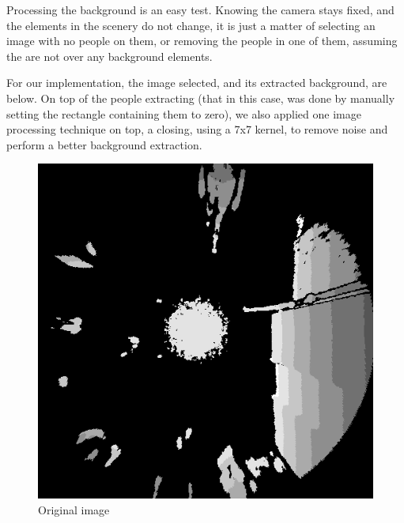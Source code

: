 \documentclass[conference]{IEEEtran}
\begin{document}
Processing the background is an easy test. Knowing the camera stays fixed, and the elements in the scenery do not change, it is just a matter of selecting an image with no people on them, or removing the people in one of them, assuming the are not over any background elements.

For our implementation, the image selected, and its extracted background, are below. On top of the people extracting (that in this case, was done by manually setting the rectangle containing them to zero), we also applied one image processing technique on top, a closing, using a 7x7 kernel, to remove noise and perform a better background extraction.

\begin{figure}[ht!]
    \centering
    \begin{minipage}[b]{0.22\textwidth}
        \centering
        \includegraphics[width=\textwidth]{Images/classical/112.png}
        \caption{Original image}\label{fig:NetRes3}
    \end{minipage}
    \hfill
    \begin{minipage}[b]{0.22\textwidth}
        \centering

\end{minipage}
\end{figure}
\end{document}
